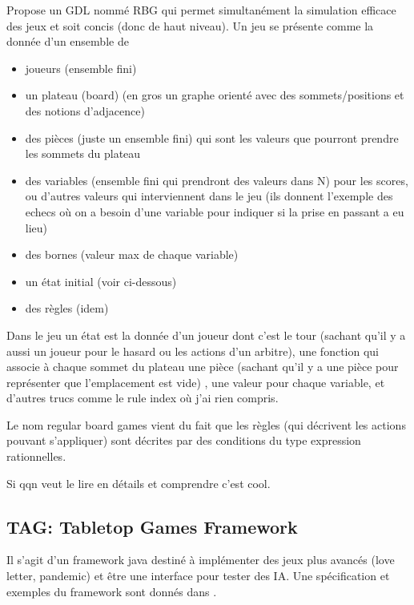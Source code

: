 \documentclass[a4paper,11pt]{article}
\begin{document}
Propose un GDL nommé RBG qui permet simultanément la simulation efficace des
jeux et soit concis (donc de haut niveau). Un jeu se présente comme la donnée
d'un ensemble de
\begin{itemize}
  \item joueurs (ensemble fini)
  \item un plateau (board) (en gros un graphe orienté avec des
sommets/positions et des notions d'adjacence)
  \item des pièces (juste un ensemble fini) qui sont les valeurs que pourront
    prendre les sommets du plateau 
  \item des variables (ensemble fini qui prendront des valeurs dans N) pour
    les scores, ou d'autres valeurs qui interviennent dans le jeu (ils donnent
    l'exemple des echecs où on a besoin d'une variable pour indiquer si la prise
    en passant a eu lieu)
  \item des bornes (valeur max de chaque variable)
  \item un état initial (voir ci-dessous)
  \item des règles (idem)
\end{itemize} 

Dans le jeu un état est la donnée d'un joueur dont c'est le tour (sachant qu'il
y a aussi un joueur pour le hasard ou les actions d'un arbitre), une fonction
qui associe à chaque sommet du plateau une pièce (sachant qu'il y a une pièce
pour représenter que l'emplacement est vide) , une valeur pour chaque variable, 
et d'autres trucs comme le rule index où j'ai rien compris.

Le nom regular board games vient du fait que les règles (qui décrivent les
actions pouvant s'appliquer) sont décrites par des conditions du type expression
rationnelles.

Si qqn veut le lire en détails et comprendre c'est cool.

\subsection{TAG: Tabletop Games Framework \cite{gaina2020tag}}

Il s'agit d'un framework java destiné à implémenter des jeux plus avancés (love
letter, pandemic) et être une interface pour tester des IA. Une spécification et exemples du
framework sont donnés dans \cite{gaina2020design}.



\end{document}
